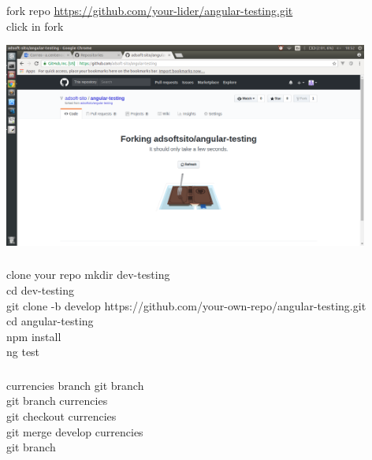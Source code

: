 \documentclass{beamer}
\begin{document}
\begin{frame}\frametitle{} 

\begin{block}{fork repo}
\url{https://github.com/your-lider/angular-testing.git} \\
click in fork
\end{block}

\begin{center}
\includegraphics[width=0.9\textwidth]{forking.png}
\end{center}

\end{frame}

\begin{frame}\frametitle{} 


\begin{block}{clone your repo}
mkdir dev-testing \\
cd dev-testing	 \\
git clone -b develop https://github.com/your-own-repo/angular-testing.git \\
cd angular-testing \\
npm install \\
ng test   
\end{block}

\end{frame}


\begin{frame}\frametitle{} 


\begin{block}{currencies branch}
git branch \\
git branch currencies \\
git checkout currencies \\
git merge develop currencies \\
git branch 
\end{block}

\end{frame}
\end{document}
